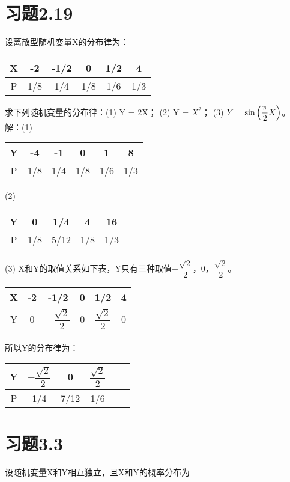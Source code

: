 \documentclass[a4papers]{ctexart}
\begin{document}
\section{习题2.19}
设离散型随机变量X的分布律为：\\
\begin{center}
\begin{tabular}{c|ccccc}
X & -2 & -1/2 & 0 & 1/2 & 4 \\
\hline
P & 1/8 & 1/4 & 1/8 & 1/6 & 1/3
\end{tabular}
\end{center}
求下列随机变量的分布律：(1) Y = 2X； (2) Y = $X^2$； (3) $Y = {\rm \sin}\left(\dfrac{\pi}{2}X\right)$。\\
解：(1)
\begin{center}
\begin{tabular}{c|ccccc}
Y & -4 & -1 & 0 & 1 & 8 \\
\hline
P & 1/8 & 1/4 & 1/8 & 1/6 & 1/3
\end{tabular}
\end{center}
(2)
\begin{center}
\begin{tabular}{c|cccc}
Y & 0 & 1/4 & 4 & 16 \\
\hline
P & 1/8 & 5/12 & 1/8 & 1/3 
\end{tabular}
\end{center}
(3)
X和Y的取值关系如下表，Y只有三种取值$-\dfrac{\sqrt{2}}{2}$，$0$，$\dfrac{\sqrt{2}}{2}$。\\
\begin{center}
\begin{tabular}{c|ccccc}
X & -2 & -1/2 & 0 & 1/2 & 4 \\
\hline
Y & 0 & $-\dfrac{\sqrt{2}}{2}$ & 0 & $\dfrac{\sqrt{2}}{2}$ & 0
\end{tabular}
\end{center}
所以Y的分布律为：\\
\begin{center}
\begin{tabular}{c|ccccc}
Y & $-\dfrac{\sqrt{2}}{2}$ & 0 & $\dfrac{\sqrt{2}}{2}$ \\
\hline
P & 1/4 & 7/12 & 1/6 
\end{tabular}
\end{center}

\section{习题3.3}
设随机变量X和Y相互独立，且X和Y的概率分布为\\
\end{document}
